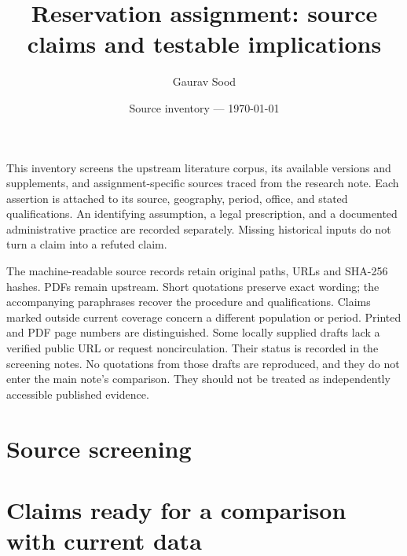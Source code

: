 \documentclass[10pt]{article}
\title{Reservation assignment: source claims and testable implications}
\author{Gaurav Sood}
\date{Source inventory --- \today}
\begin{document}
\maketitle
This inventory screens the upstream literature corpus, its available versions and supplements, and assignment-specific sources traced from the research note. Each assertion is attached to its source, geography, period, office, and stated qualifications. An identifying assumption, a legal prescription, and a documented administrative practice are recorded separately. Missing historical inputs do not turn a claim into a refuted claim.

The machine-readable source records retain original paths, URLs and SHA-256 hashes. PDFs remain upstream. Short quotations preserve exact wording; the accompanying paraphrases recover the procedure and qualifications. Claims marked outside current coverage concern a different population or period. Printed and PDF page numbers are distinguished.
Some locally supplied drafts lack a verified public URL or request noncirculation. Their status is recorded in the screening notes. No quotations from those drafts are reproduced, and they do not enter the main note's comparison. They should not be treated as independently accessible published evidence.
\section{Source screening}
\footnotesize\normalsize

\section{Claims ready for a comparison with current data}
\footnotesize\normalsize


\end{document}
